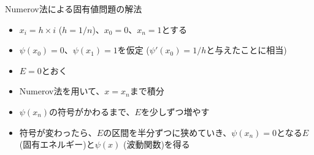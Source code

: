 \begin{frame}[t,fragile]{Numerov法による固有値問題の解法}
  \begin{itemize}
    \setlength{\itemsep}{1em}
  \item $x_i=h \times i$ ($h=1/n$)、$x_0=0$、$x_n=1$とする
  \item $\psi(x_0)=0$、$\psi(x_1) = 1$を仮定 ($\psi'(x_0)=1/h$と与えたことに相当)
  \item $E = 0$とおく
  \item Numerov法を用いて、$x=x_n$まで積分
  \item $\psi(x_n)$の符号がかわるまで、$E$を少しずつ増やす
  \item 符号が変わったら、$E$の区間を半分ずつに狭めていき、$\psi(x_n)=0$となる$E$ (固有エネルギー)と$\psi(x)$ (波動関数)を得る
  \end{itemize}
\end{frame}
